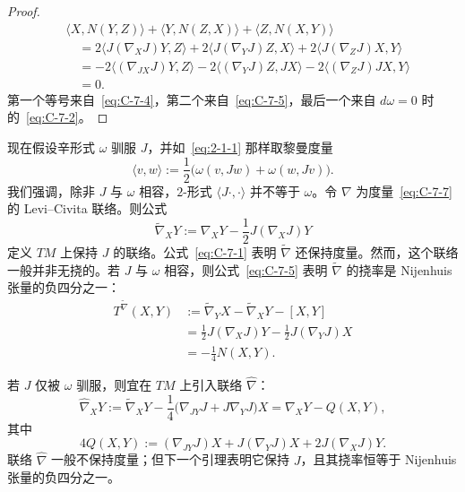 \begin{proof}
\begin{align*}
  &\langle X,N(Y,Z)\rangle+\langle Y,N(Z,X)\rangle
    +\langle Z,N(X,Y)\rangle\\
  &\quad=2\langle J(\nabla_XJ)Y,Z\rangle
    +2\langle J(\nabla_YJ)Z,X\rangle
    +2\langle J(\nabla_ZJ)X,Y\rangle\\
  &\quad=-2\langle(\nabla_{JX}J)Y,Z\rangle
    -2\langle(\nabla_YJ)Z,JX\rangle
    -2\langle(\nabla_ZJ)JX,Y\rangle\\
  &\quad=0.
\end{align*}
第一个等号来自~\eqref{eq:C-7-4}，第二个来自~\eqref{eq:C-7-5}，最后一个来自 $d\omega=0$ 时的~\eqref{eq:C-7-2}。
\end{proof}

现在假设辛形式 $\omega$ 驯服 $J$，并如~\eqref{eq:2-1-1} 那样取黎曼度量
\begin{equation}\label{eq:C-7-7}
  \langle v,w\rangle:=\frac12\bigl(\omega(v,Jw)+\omega(w,Jv)\bigr).
\end{equation}
我们强调，除非 $J$ 与 $\omega$ 相容，$2$-形式 $\langle J\cdot,\cdot\rangle$ 并不等于 $\omega$。令 $\nabla$ 为度量~\eqref{eq:C-7-7} 的 Levi--Civita 联络。则公式
\[
  \widetilde\nabla_XY:=\nabla_XY-\frac12J(\nabla_XJ)Y
\]
定义 $TM$ 上保持 $J$ 的联络。公式~\eqref{eq:C-7-1} 表明 $\widetilde\nabla$ 还保持度量。然而，这个联络一般并非无挠的。若 $J$ 与 $\omega$ 相容，则公式~\eqref{eq:C-7-5} 表明 $\widetilde\nabla$ 的挠率是 Nijenhuis 张量的负四分之一：
\begin{align*}
  T^{\widetilde\nabla}(X,Y)
  &:=\widetilde\nabla_YX-\widetilde\nabla_XY-[X,Y]\\
  &=\frac12J(\nabla_XJ)Y-\frac12J(\nabla_YJ)X\\
  &=-\frac14N(X,Y).
\end{align*}

若 $J$ 仅被 $\omega$ 驯服，则宜在 $TM$ 上引入联络 $\widehat\nabla$：
\begin{equation}\label{eq:C-7-8}
  \widehat\nabla_XY
  :=\widetilde\nabla_XY-\frac14\bigl(\nabla_{JY}J+J\nabla_YJ\bigr)X
  =\nabla_XY-Q(X,Y),
\end{equation}
其中
\begin{equation}\label{eq:C-7-9}
  4Q(X,Y):=(\nabla_{JY}J)X+J(\nabla_YJ)X+2J(\nabla_XJ)Y.
\end{equation}
联络 $\widehat\nabla$ 一般不保持度量；但下一个引理表明它保持 $J$，且其挠率恒等于 Nijenhuis 张量的负四分之一。

